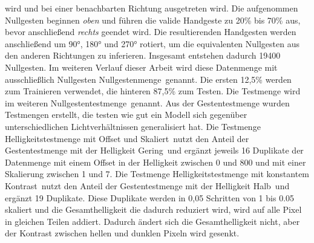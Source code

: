 wird und bei einer benachbarten Richtung ausgetreten wird. Die aufgenommen Nullgesten beginnen \textit{oben} und führen die valide Handgeste zu 20\% bis 70\% aus, bevor anschließend \textit{rechts}
geendet wird. Die resultierenden Handgesten werden anschließend um 90°, 180° und 270° rotiert, um die equivalenten Nullgesten aus den anderen Richtungen zu inferieren. Insgesamt entstehen dadurch 19400
Nullgesten. Im weiteren Verlauf dieser Arbeit wird diese Datenmenge mit ausschließlich Nullgesten \glqq Nullgestenmenge\grqq\ genannt. Die ersten 12,5\% werden zum Trainieren verwendet, die hinteren 87,5\% zum
Testen. Die Testmenge wird im weiteren \glqq Nullgestentestmenge\grqq\ genannt.
\newpage
Aus der Gestentestmenge wurden Testmengen erstellt, die testen wie gut ein Modell sich gegenüber unterschiedlichen Lichtverhältnissen generalisiert hat. Die Testmenge \glqq Helligkeitstestmenge mit Offset und Skaliert\grqq\
nutzt den Anteil der Gestentestmenge mit der Helligkeit \glqq Gering\grqq\ und ergänzt jeweils 16 Duplikate der Datenmenge mit einem Offset in der Helligkeit zwischen 0 und 800 und mit einer Skalierung
zwischen 1 und 7. Die Testmenge \glqq Helligkeitstestmenge mit konstantem Kontrast\grqq\ nutzt den Anteil der Gestentestmenge mit der Helligkeit \glqq Halb\grqq\ und ergänzt 19 Duplikate. Diese Duplikate werden in 0,05 Schritten
von 1 bis 0.05 skaliert und die Gesamthelligkeit die dadurch reduziert wird, wird auf alle Pixel in gleichen Teilen addiert. Dadurch ändert sich die Gesamthelligkeit nicht, aber der Kontrast zwischen hellen
und dunklen Pixeln wird gesenkt.